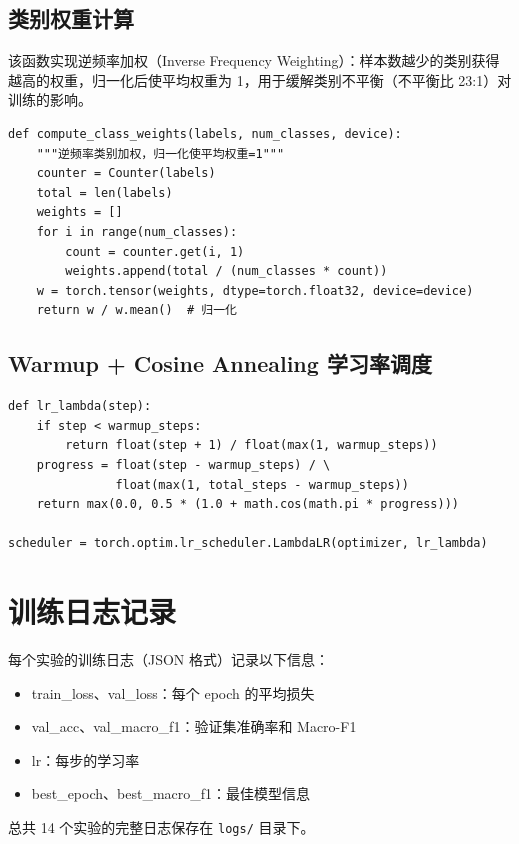 \subsection{类别权重计算}

该函数实现逆频率加权（Inverse Frequency Weighting）：样本数越少的类别获得越高的权重，归一化后使平均权重为 1，用于缓解类别不平衡（不平衡比 23:1）对训练的影响。

\begin{lstlisting}[style=cleanpython]
def compute_class_weights(labels, num_classes, device):
    """逆频率类别加权，归一化使平均权重=1"""
    counter = Counter(labels)
    total = len(labels)
    weights = []
    for i in range(num_classes):
        count = counter.get(i, 1)
        weights.append(total / (num_classes * count))
    w = torch.tensor(weights, dtype=torch.float32, device=device)
    return w / w.mean()  # 归一化
\end{lstlisting}

\subsection{Warmup + Cosine Annealing 学习率调度}

\begin{lstlisting}[style=cleanpython]
def lr_lambda(step):
    if step < warmup_steps:
        return float(step + 1) / float(max(1, warmup_steps))
    progress = float(step - warmup_steps) / \
               float(max(1, total_steps - warmup_steps))
    return max(0.0, 0.5 * (1.0 + math.cos(math.pi * progress)))

scheduler = torch.optim.lr_scheduler.LambdaLR(optimizer, lr_lambda)
\end{lstlisting}

\section{训练日志记录}

每个实验的训练日志（JSON 格式）记录以下信息：
\begin{itemize}
\item train\_loss、val\_loss：每个 epoch 的平均损失
\item val\_acc、val\_macro\_f1：验证集准确率和 Macro-F1
\item lr：每步的学习率
\item best\_epoch、best\_macro\_f1：最佳模型信息
\end{itemize}

总共 14 个实验的完整日志保存在 \texttt{logs/} 目录下。

